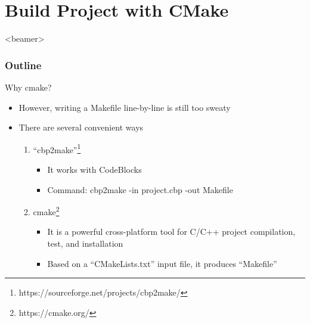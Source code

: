 \section{Build Project with CMake}
\label{sec:cmake}
\begin{frame}<beamer>
    \frametitle{Outline}
    \tableofcontents[currentsection]
\end{frame}

\begin{frame}{Why cmake?}
\vspace{0.3in}
\begin{itemize}
	\item {However, writing a Makefile line-by-line is still too sweaty}
	\item {There are several convenient ways}
	\begin{enumerate}
			\item {``cbp2make''\footnote{https://sourceforge.net/projects/cbp2make/}}
			\begin{itemize}
				\item {It works with CodeBlocks}
					\vspace{0.15in}
				\item {Command: cbp2make -in project.cbp -out Makefile}
			\end{itemize}
				\vspace{0.15in}
			\item {cmake\footnote{https://cmake.org/}}
			\begin{itemize}
				\item {It is a powerful cross-platform tool for C/C++ project compilation, test, and installation}
					\vspace{0.15in}
				\item {Based on a ``CMakeLists.txt'' input file, it produces ``Makefile''}
			\end{itemize}
	\end{enumerate}
\end{itemize}

\end{frame}

